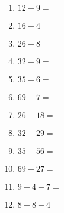 \documentclass[a4paper,12pt]{article}
\begin{document}
\begin{multicols}{2}
\begin{enumerate}[label=\arabic*.]
    \item \textbf{\Large $12 + 9 =$} \underline{\hspace{2cm}} \vspace{1.5cm}
    \item \textbf{\Large $16 + 4 =$} \underline{\hspace{2cm}} \vspace{1.5cm}
    \item \textbf{\Large $26 + 8 =$} \underline{\hspace{2cm}} \vspace{1.5cm}
    \item \textbf{\Large $32 + 9 =$} \underline{\hspace{2cm}} \vspace{1.5cm}
    \item \textbf{\Large $35 + 6 =$} \underline{\hspace{2cm}} \vspace{1.5cm}
    \item \textbf{\Large $69 + 7 =$} \underline{\hspace{2cm}} \vspace{1.5cm}
    \item \textbf{\Large $26 + 18 =$} \underline{\hspace{2cm}} \vspace{1.5cm}
    \item \textbf{\Large $32 + 29 =$} \underline{\hspace{2cm}} \vspace{1.5cm}
    \item \textbf{\Large $35 + 56 =$} \underline{\hspace{2cm}} \vspace{1.5cm}
    \item \textbf{\Large $69 + 27 =$} \underline{\hspace{2cm}} \vspace{1.5cm}
    \item \textbf{\Large $9 + 4 + 7 =$} \underline{\hspace{2cm}} \vspace{1.5cm}
    \item \textbf{\Large $8 + 8 + 4 =$} \underline{\hspace{2cm}} \vspace{1.5cm}
\end{enumerate}
\end{multicols}



\newpage
\end{document}
